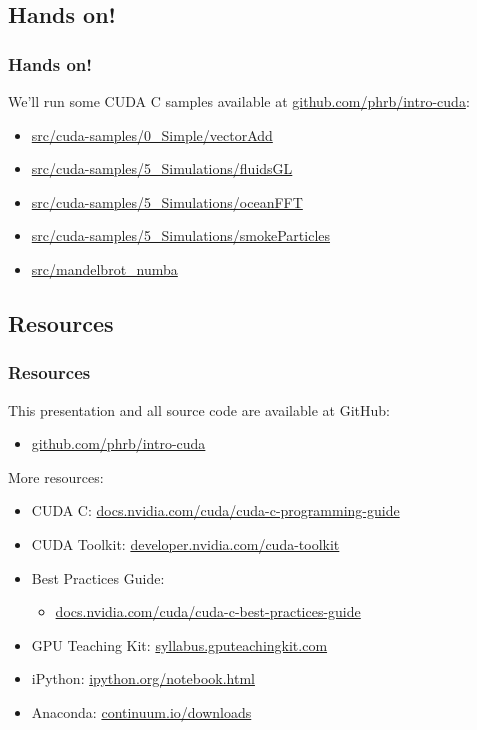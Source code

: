 \documentclass[10pt, compress]{beamer}
\begin{document}
\subsection{Hands on!}

\begin{frame}
    \frametitle{Hands on!}
    We'll run some CUDA C samples available at
    \url{github.com/phrb/intro-cuda}:
    \begin{itemize}
        \item \url{src/cuda-samples/0_Simple/vectorAdd}
            \pause
        \item \url{src/cuda-samples/5_Simulations/fluidsGL}
        \item \url{src/cuda-samples/5_Simulations/oceanFFT}
        \item \url{src/cuda-samples/5_Simulations/smokeParticles}
            \pause
        \item \url{src/mandelbrot_numba}
    \end{itemize}
\end{frame}

\subsection{Resources}

\begin{frame}
    \frametitle{Resources}
    This presentation and all source code are available
    at \alert{GitHub}:

    \begin{itemize}
        \item \url{github.com/phrb/intro-cuda}
    \end{itemize}

    More resources:

    \begin{itemize}
        \item CUDA C: \url{docs.nvidia.com/cuda/cuda-c-programming-guide}
        \item CUDA Toolkit: \url{developer.nvidia.com/cuda-toolkit}
        \item Best Practices Guide:
            \begin{itemize}
                \item \url{docs.nvidia.com/cuda/cuda-c-best-practices-guide}
            \end{itemize}
        \item GPU Teaching Kit: \url{syllabus.gputeachingkit.com}
        \item iPython: \url{ipython.org/notebook.html}
        \item Anaconda: \url{continuum.io/downloads}
    \end{itemize}
\end{frame}
\end{document}
